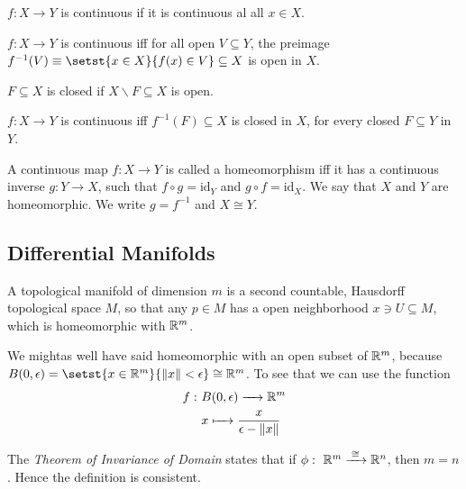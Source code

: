 \begin{definition}
	$f:X\to Y$ is continuous if it is continuous al all $x\in X$.
\end{definition}

\begin{proposition}
	$f:X\to Y$ is continuous iff for all open $V\subseteq Y$, the preimage $f^{-1}(V) \equiv \setst{x \in X}{ f(x) \in V} \subseteq X$ is open in $X$.	
\end{proposition}

\begin{definition}
	$F\subseteq X$ is closed if $X\backslash F \subseteq X$ is open.
\end{definition}

\begin{proposition}
	$f:X\to Y$ is continuous iff $f^{-1}(F) \subseteq X$ is closed in $X$, for every closed $F\subseteq Y$ in $Y$.
\end{proposition}

\begin{definition}
	A continuous map $f:X\to Y$ is called a homeomorphism iff it has a continuous inverse $g:Y\to X$, such that $f \circ g = \mathrm{id}_Y$ and $g \circ f = \mathrm{id}_X$. We say that $X$ and $Y$ are homeomorphic. We write $g=f^{-1}$ and $X \cong Y$. 
\end{definition}

\subsection{Differential Manifolds}

\begin{definition}
	A topological manifold of dimension $m$ is a second countable, Hausdorff topological space $M$, so that any $p \in M$ has a open neighborhood $x \ni U \subseteq M$, which is homeomorphic with $\mathbb R^m$.
\end{definition}

\begin{remark}
	We mightas well have said homeomorphic with an open subset of $\mathbb R^m$, because $B(0,\epsilon) = \setst{x\in \bbR^m}{ \norm{x} < \epsilon } \cong \bbR^m$. To see that we can use the function
	\begin{align*}
		f:~&B(0,\epsilon) \to \bbR^m \\
		& x \mapsto \frac{x}{\epsilon-\norm{x}}
	\end{align*}
\end{remark}

\begin{remark}
	The \emph{Theorem of Invariance of Domain} states that if $\phi:~\mathbb R^m \xrightarrow{\;\cong\;} \mathbb R^n$, then $m=n$. Hence the definition is consistent.
\end{remark}




